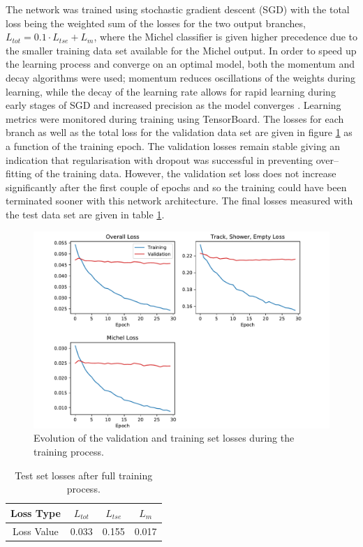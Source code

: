 The network was trained using stochastic gradient descent (SGD) with the total
loss being the weighted sum of the losses for the two output branches, \(L_{tot}
= 0.1 \cdot L_{tse} + L_m\), where the Michel classifier is given higher
precedence due to the smaller training data set available for the Michel output.
In order to speed up the learning process and converge on an optimal model, both
the momentum and decay algorithms were used; momentum reduces oscillations of
the weights during learning, while the decay of the learning rate allows for
rapid learning during early stages of SGD and increased precision as the model
converges \cite{Reed:1998:NSS:552600}. Learning metrics were monitored during
training using TensorBoard. The losses for each branch as well as the total loss
for the validation data set are given in figure \ref{fig:training} as a function
of the training epoch. The validation losses remain stable giving an indication
that regularisation with dropout was successful in preventing over--fitting of
the training data. However, the validation set loss does not increase
significantly after the first couple of epochs and so the training could have
been terminated sooner with this network architecture. The final losses measured
with the test data set are given in table \ref{tab:losses}. 

\begin{figure}[h]
	\centering
	\includegraphics[width=\textwidth]{figures/losses_prelu.pdf}
	\caption[Validation and training set losses.]{Evolution of the validation
	and 
	training set losses during the training process.}
	\label{fig:training}
\end{figure}

\begin{table}[h]
	\centering
	\begin{tabular}{c|c|c|c}
		Loss Type   & \(L_{tot}\) & \(L_{tse}\) & \(L_m\) \\ \hline
		Loss Value  & 0.033       & 0.155       & 0.017   \\
	\end{tabular}
	\caption[Test set losses.]{Test set losses after full training process.}
	\label{tab:losses}
\end{table}

